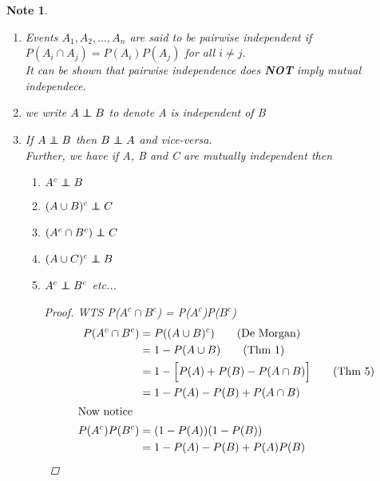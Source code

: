 \documentclass[11pt]{article}
\newtheorem*{note}{Note}
\newcommand\independent{\protect\mathpalette{\protect\independenT}{\perp}}
\def\independenT#1#2{\mathrel{\rlap{$#1#2$}\mkern2mu{#1#2}}}
\newcommand\tab[1][1cm]{\hspace*{#1}}
\begin{document}
            \begin{note}\tab 
                \begin{enumerate}
                    \item Events $A_1,A_2,...,A_n$ are said to be pairwise independent if
                            $P(A_i \cap A_j) = P(A_i)P(A_j)$ for all $i\neq j$. \\
                            It can be shown that pairwise independence does \textbf{NOT} imply mutual independece. 
                    \item we write $A \independent B$ to denote A is independent of B
                    \item If $A \independent B $ then $B \independent A$ and vice-versa. \\
                            Further, we have if A, B and C are mutually independent then 
                            \begin{enumerate}
                                \item $A^c \independent B $
                                \item $(A \cup B )^c \independent C$
                                \item $(A^c \cap B^c )\independent C$
                                \item $(A \cup C)^c \independent B$
                                \item $A^c \independent B^c$ etc...
                                        \begin{proof}
                                            WTS P($A^c \cap B^c$) = P($A^c$)P($B^c$) 
                                            \begin{align*}
                                                P(A^c \cap B^c) &= P((A\cup B)^c) \tag{De Morgan} \\
                                                                &= 1 - P(A \cup B) \tag{Thm 1}\\
                                                                &= 1- \Big[ P(A) + P(B) - P(A \cap B)\Big] \tag{Thm 5} \\
                                                                &= 1- P(A) - P(B) + P(A \cap B) \\
                                                \intertext{Now notice}
                                                P(A^c)P(B^c)    &= (1-P(A))(1-P(B))\\
                                                                &= 1-P(A)-P(B) +P(A)P(B) \\

\end{align*}
\end{proof}
\end{enumerate}
\end{enumerate}
\end{note}
\end{document}
